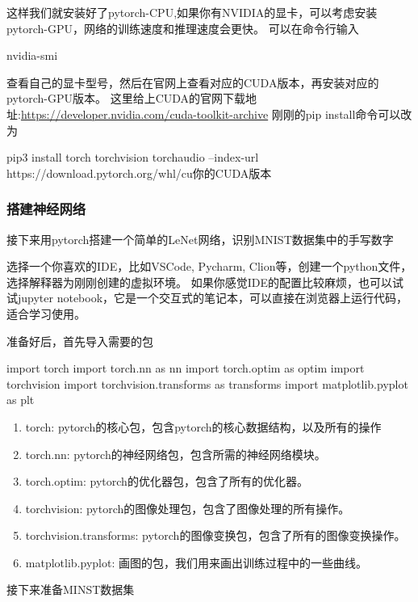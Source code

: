 这样我们就安装好了pytorch-CPU,如果你有NVIDIA的显卡，可以考虑安装pytorch-GPU，网络的训练速度和推理速度会更快。
可以在命令行输入
\begin{tbash}
    nvidia-smi
\end{tbash}
查看自己的显卡型号，然后在官网上查看对应的CUDA版本，再安装对应的pytorch-GPU版本。
这里给上CUDA的官网下载地址:\url{https://developer.nvidia.com/cuda-toolkit-archive}
刚刚的pip install命令可以改为
\begin{tbash}
    pip3 install torch torchvision torchaudio --index-url https://download.pytorch.org/whl/cu{你的CUDA版本}
\end{tbash}

\subsubsection{搭建神经网络}
接下来用pytorch搭建一个简单的LeNet网络，识别MNIST数据集中的手写数字

选择一个你喜欢的IDE，比如VSCode, Pycharm, Clion等，创建一个python文件，选择解释器为刚刚创建的虚拟环境。
如果你感觉IDE的配置比较麻烦，也可以试试jupyter notebook，它是一个交互式的笔记本，可以直接在浏览器上运行代码，适合学习使用。

准备好后，首先导入需要的包
\begin{tpython}
    import torch
    import torch.nn as nn
    import torch.optim as optim
    import torchvision
    import torchvision.transforms as transforms
    import matplotlib.pyplot as plt
\end{tpython}
\begin{enumerate}
    \item torch: pytorch的核心包，包含pytorch的核心数据结构，以及所有的操作
    \item torch.nn: pytorch的神经网络包，包含所需的神经网络模块。
    \item torch.optim: pytorch的优化器包，包含了所有的优化器。
    \item torchvision: pytorch的图像处理包，包含了图像处理的所有操作。
    \item torchvision.transforms: pytorch的图像变换包，包含了所有的图像变换操作。
    \item matplotlib.pyplot: 画图的包，我们用来画出训练过程中的一些曲线。
\end{enumerate}

接下来准备MINST数据集

